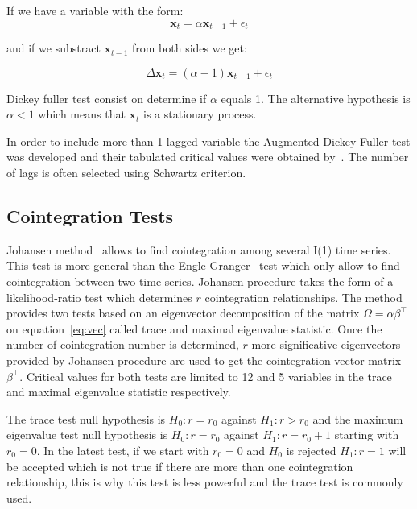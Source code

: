 If we have a variable with the form:
\[
\mathbf{x}_t = \alpha \mathbf{x}_{t-1} + \epsilon_t
\]

\noindent and if we substract $\mathbf{x}_{t-1}$ from both sides we get:

\begin{equation}
\label{eq:DF}
\Delta \mathbf{x}_t = (\alpha-1) \mathbf{x}_{t-1} + \epsilon_t
\end{equation}

Dickey fuller test consist on determine if $\alpha$ equals 1. The alternative
hypothesis is $\alpha < 1$ which means that $\mathbf{x}_t$ is a stationary
process. 

In order to include more than 1 lagged variable the Augmented Dickey-Fuller
test was developed and their tabulated critical values were obtained
by~\cite{mackinnon2010}. The number of lags is often selected using Schwartz
criterion.

\subsection {Cointegration Tests}

Johansen method~\cite{johansen1988} allows to find cointegration among several
I(1) time series. This test is more general than the
Engle-Granger~\cite{engle1987} test which only allow to find cointegration
between two time series.  Johansen procedure takes the form of a
likelihood-ratio test which determines $r$ cointegration relationships. The
method provides two tests based on an eigenvector decomposition of the matrix
$\Omega = \alpha \beta^\top$ on equation~\ref{eq:vec} called trace and maximal
eigenvalue statistic.  Once the number of cointegration number is determined,
$r$ more significative eigenvectors provided by Johansen procedure are used to
get the cointegration vector matrix $\beta^\top$.  Critical values for both
tests are limited to 12 and 5 variables in the trace and maximal eigenvalue
statistic respectively.

The trace test null hypothesis is $H_0: r = r_0$ against $H_1: r > r_0$ and the
maximum eigenvalue test null hypothesis is $H_0: r = r_0$ against $H_1: r =
r_0+1$ starting with $r_0 = 0$.  In the latest test, if we start with $r_0=0$
and $H_0$ is rejected $H_1: r = 1$ will be accepted which is not true if there
are more than one cointegration relationship, this is why this test is less
powerful and the trace test is commonly used.







